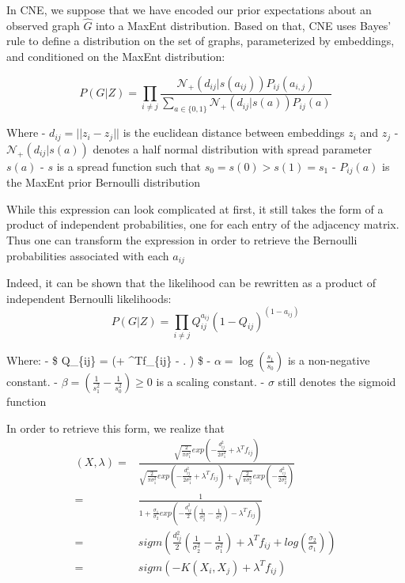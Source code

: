 In CNE, we suppose that we have encoded our prior expectations about an
observed graph \(\hat{G}\) into a MaxEnt distribution. Based on that,
CNE uses Bayes' rule to define a distribution on the set of graphs,
parameterized by embeddings, and conditioned on the MaxEnt distribution:

\[
P(G|Z) = 
\prod_{i\neq j} 
\frac{
  \mathcal{N}_{+}(d_{ij}|s(a_{ij})) 
  P_{ij}(a_{i,j})
}{
  \sum\limits_{a \in \{0,1\}}
  \mathcal{N}_{+}(d_{ij}|s(a)) 
  P_{ij}(a)
  }
\]

Where - \(d_{ij} = ||z_i-z_j||\) is the euclidean distance between
embeddings \(z_i\) and \(z_j\) - \(\mathcal{N}_{+}(d_{ij}|s(a))\)
denotes a half normal distribution with spread parameter \(s(a)\) -
\(s\) is a spread function such that \(s_0=s(0)>s(1)=s_1\) -
\(P_{ij}(a)\) is the MaxEnt prior Bernoulli distribution

While this expression can look complicated at first, it still takes the
form of a product of independent probabilities, one for each entry of
the adjacency matrix. Thus one can transform the expression in order to
retrieve the Bernoulli probabilities associated with each \(a_{ij}\)

Indeed, it can be shown that the likelihood can be rewritten as a
product of independent Bernoulli likelihoods:
\[P(G|Z) = \prod\limits_{i \neq j} Q_{ij}^{a_{ij}}(1-Q_{ij})^{(1-a_{ij})}\]

Where: - \$ Q\_\{ij\} = \sigma \left(\alpha + \lambda\^{}Tf\_\{ij\} -
\beta. \right) \$ - \(\alpha=\log(\frac{s_1}{s_0})\)
is a non-negative constant. -
\(\beta=(\frac{1}{s_1^2} - \frac{1}{s_0^2}) \geq 0\) is a scaling
constant. - \(\sigma\) still denotes the sigmoid function

In order to retrieve this form, we realize that \[
  \begin{aligned}
  (X, \lambda) 
  =& \frac{
    \sqrt{\frac{2}{\pi \sigma_1^2}} 
    exp(- \frac{d_{ij}^2}{2 \sigma_1^2} + \lambda^Tf_{ij})
    }{
      \sqrt{\frac{2}{\pi \sigma_1^2}} 
      exp(- \frac{d_{ij}^2}{2 \sigma_1^2} + \lambda^Tf_{ij}) 
      + 
      \sqrt{\frac{2}{\pi \sigma_2^2}} 
      exp(- \frac{d_{ij}^2}{2 \sigma_2^2})
      } \\
=& \frac{1}{1 + \frac{\sigma_1}{\sigma_2} exp(- \frac{d_{ij}^2}{2}(\frac{1}{\sigma_2^2} - \frac{1}{\sigma_1^2}) - \lambda^Tf_{ij})} \\
=& sigm(\frac{d_{ij}^2}{2}(\frac{1}{\sigma_2^2} - \frac{1}{\sigma_1^2}) + \lambda^Tf_{ij} + log(\frac{\sigma_2}{\sigma_1})) \\
=& sigm(-K(X_i, X_j) + \lambda^Tf_{ij}) \\
\end{aligned}
\]

